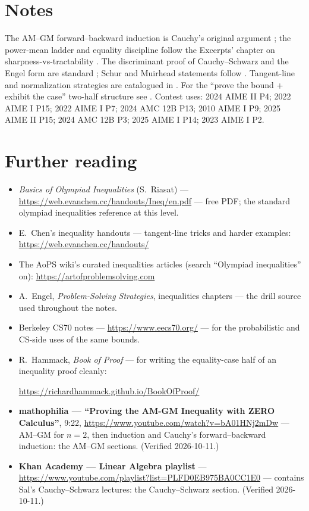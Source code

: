\section*{Notes}
The AM--GM forward--backward induction is Cauchy's original argument
\cite{otis}; the power-mean ladder and equality discipline follow the
Excerpts' chapter on sharpness-vs-tractability \cite{otis}. The
discriminant proof of Cauchy--Schwarz and the Engel form are standard
\cite{engel}; Schur and Muirhead statements follow \cite{otis}. Tangent-line
and normalization strategies are catalogued in \cite{chen-ineq}. For the
``prove the bound + exhibit the case'' two-half structure see
\cite{velleman}. Contest uses: 2024 AIME II P4; 2022 AIME I P15;
2022 AIME I P7; 2024 AMC 12B P13; 2010 AIME I P9; 2025 AIME II P15;
2024 AMC 12B P3; 2025 AIME I P14; 2023 AIME I P2.

\section*{Further reading}
\begin{itemize}
\item \emph{Basics of Olympiad Inequalities} (S.~Riasat) ---
\url{https://web.evanchen.cc/handouts/Ineq/en.pdf} --- free PDF; the
standard olympiad inequalities reference at this level.
\item E.~Chen's inequality handouts --- tangent-line tricks and harder
examples:
\url{https://web.evanchen.cc/handouts/}
\item The AoPS wiki's curated inequalities articles (search ``Olympiad
inequalities'' on):
\url{https://artofproblemsolving.com}
\item A.~Engel, \emph{Problem-Solving Strategies}, inequalities
chapters --- the drill source used throughout the notes.
\item Berkeley CS70 notes ---
\url{https://www.eecs70.org/} --- for the probabilistic and CS-side uses
of the same bounds.
\item R.~Hammack, \emph{Book of Proof} --- for writing the
equality-case half of an inequality proof cleanly:

\url{https://richardhammack.github.io/BookOfProof/}
\end{itemize}

\begin{rulebox}
\begin{itemize}
\item \textbf{mathophilia --- ``Proving the AM-GM Inequality with ZERO
Calculus''}, 9:22,
\url{https://www.youtube.com/watch?v=bA01HNj2mDw} --- AM--GM for
$n=2$, then induction and Cauchy's forward--backward induction:
the AM--GM sections. (Verified 2026-10-11.)
\item \textbf{Khan Academy --- Linear Algebra playlist} ---
\url{https://www.youtube.com/playlist?list=PLFD0EB975BA0CC1E0}
--- 
contains Sal's Cauchy--Schwarz lectures: the Cauchy--Schwarz section.
(Verified 2026-10-11.)
\end{itemize}
\end{rulebox}

\chapternotes
